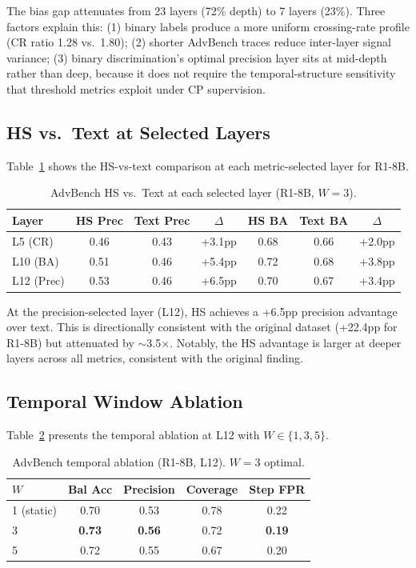 \documentclass[11pt]{article}
\begin{document}
The bias gap attenuates from 23 layers (72\% depth) to 7 layers (23\%). Three factors explain this: (1) binary labels produce a more uniform crossing-rate profile (CR ratio 1.28 vs.\ 1.80); (2) shorter AdvBench traces reduce inter-layer signal variance; (3) binary discrimination's optimal precision layer sits at mid-depth rather than deep, because it does not require the temporal-structure sensitivity that threshold metrics exploit under CP supervision.

\subsection{HS vs.\ Text at Selected Layers}

Table~\ref{tab:hs-text-layer} shows the HS-vs-text comparison at each metric-selected layer for R1-8B.

\begin{table}[t]
\centering
\small
\caption{AdvBench HS vs.\ Text at each selected layer (R1-8B, $W{=}3$).}
\label{tab:hs-text-layer}
\begin{tabular}{lcccccc}
\toprule
Layer & HS Prec & Text Prec & $\Delta$ & HS BA & Text BA & $\Delta$ \\
\midrule
L5 (CR)   & 0.46 & 0.43 & +3.1pp & 0.68 & 0.66 & +2.0pp \\
L10 (BA)  & 0.51 & 0.46 & +5.4pp & 0.72 & 0.68 & +3.8pp \\
L12 (Prec) & 0.53 & 0.46 & +6.5pp & 0.70 & 0.67 & +3.4pp \\
\bottomrule
\end{tabular}
\end{table}

At the precision-selected layer (L12), HS achieves a +6.5pp precision advantage over text. This is directionally consistent with the original dataset (+22.4pp for R1-8B) but attenuated by $\sim$3.5$\times$. Notably, the HS advantage is larger at deeper layers across all metrics, consistent with the original finding.

\subsection{Temporal Window Ablation}

Table~\ref{tab:temporal} presents the temporal ablation at L12 with $W \in \{1, 3, 5\}$.

\begin{table}[t]
\centering
\small
\caption{AdvBench temporal ablation (R1-8B, L12). $W{=}3$ optimal.}
\label{tab:temporal}
\begin{tabular}{lcccc}
\toprule
$W$ & Bal Acc & Precision & Coverage & Step FPR \\
\midrule
1 (static) & 0.70 & 0.53 & 0.78 & 0.22 \\
3 & \textbf{0.73} & \textbf{0.56} & 0.72 & \textbf{0.19} \\
5 & 0.72 & 0.55 & 0.67 & 0.20 \\
\bottomrule
\end{tabular}
\end{table}
\end{document}
